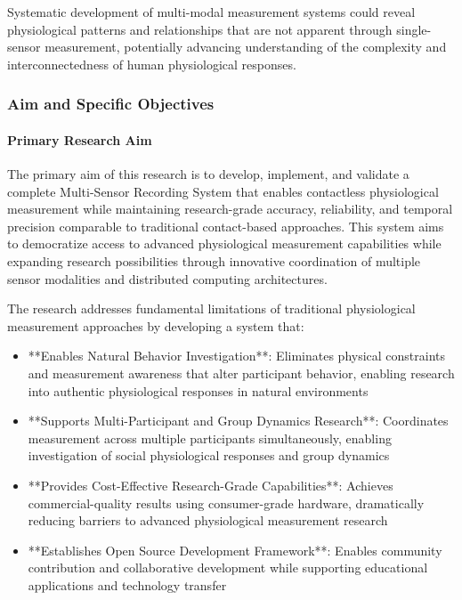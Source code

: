 \documentclass[11pt,a4paper]{article}
\begin{document}
Systematic development of multi-modal measurement systems could reveal physiological
patterns and relationships that are
not apparent through single-sensor measurement, potentially advancing understanding
of the complexity and
interconnectedness of human physiological responses.

\subsubsection{Aim and Specific Objectives}

\paragraph{Primary Research Aim}

The primary aim of this research is to develop, implement, and validate a complete
Multi-Sensor Recording System
that enables contactless physiological measurement while maintaining research-grade
accuracy, reliability, and temporal
precision comparable to traditional contact-based approaches.  This system aims to
democratize access to advanced
physiological measurement capabilities while expanding research possibilities through
innovative coordination of
multiple sensor modalities and distributed computing architectures.

The research addresses fundamental limitations of traditional physiological
measurement approaches by developing a
system that:

\begin{itemize}
\item **Enables Natural Behavior Investigation**: Eliminates physical constraints and measurement awareness that alter
  participant behavior, enabling research into authentic physiological responses in
  natural environments
\item **Supports Multi-Participant and Group Dynamics Research**: Coordinates measurement across multiple participants
  simultaneously, enabling investigation of social physiological responses and group
  dynamics
\item **Provides Cost-Effective Research-Grade Capabilities**: Achieves commercial-quality results using consumer-grade
  hardware, dramatically reducing barriers to advanced physiological measurement
  research
\item **Establishes Open Source Development Framework**: Enables community contribution and collaborative development while
  supporting educational applications and technology transfer

\end{itemize}
\end{document}

